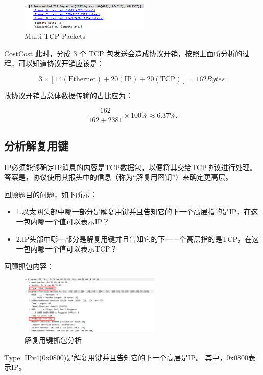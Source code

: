 \documentclass[14pt,a4paper,UTF8,twoside]{article}
\begin{document}
\begin{figure}[H]
  \centering
  \includegraphics[width=0.55\textwidth]{lab1/tcps.png}
  \caption{Multi TCP Packets}
\end{figure}

\begin{ans}{Cost}{Cost}
此时，分成 3 个 TCP 包发送会造成协议开销，按照上面所分析的过程，可以知道协议开销应该是：

\[
3 \times [14(\text{Ethernet}) + 20(\text{IP}) + 20(\text{TCP})] = 162 Bytes.
\]

故协议开销占总体数据传输的占比应为：

\[
\frac{162}{162 + 2381} \times 100 \% \approx 6.37\%. 
\]
\end{ans}

\subsection{分析解复用键}

IP必须能够确定IP消息的内容是TCP数据包，以便将其交给TCP协议进行处理。答案是，协议使用其报头中的信息（称为“解复用密钥”）来确定更高层。

回顾题目的问题，如下所示：

\begin{itemize}
  \item 1.以太网头部中哪一部分是解复用键并且告知它的下一个高层指的是IP，在这一包内哪一个值可以表示IP？
  \item 2.IP头部中哪一部分是解复用键并且告知它的下一一个高层指的是TCP，在这一包内哪一个值可以表示TCP？
\end{itemize}

回顾抓包内容：

\begin{figure}[H]
  \centering
  \includegraphics[width=0.6\textwidth]{lab1/demultiplexing.png}
  \caption{解复用键抓包分析}
\end{figure}

Type: IPv4(0x0800)是解复用键并且告知它的下一个高层是IP。
其中，0x0800表示IP。
\end{document}
